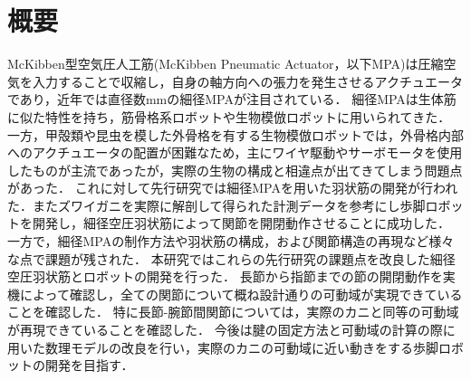 \newpage
\section*{概要}
McKibben型空気圧人工筋(McKibben Pneumatic Actuator，以下MPA)は圧縮空気を入力することで収縮し，自身の軸方向への張力を発生させるアクチュエータであり，近年では直径数mmの細径MPAが注目されている．
細径MPAは生体筋に似た特性を持ち，筋骨格系ロボットや生物模倣ロボットに用いられてきた．
一方，甲殻類や昆虫を模した外骨格を有する生物模倣ロボットでは，外骨格内部へのアクチュエータの配置が困難なため，主にワイヤ駆動やサーボモータを使用したものが主流であったが，実際の生物の構成と相違点が出てきてしまう問題点があった．
これに対して先行研究では細径MPAを用いた羽状筋の開発が行われた．またズワイガニを実際に解剖して得られた計測データを参考にし歩脚ロボットを開発し，細径空圧羽状筋によって関節を開閉動作させることに成功した．
一方で，細径MPAの制作方法や羽状筋の構成，および関節構造の再現など様々な点で課題が残された．
本研究ではこれらの先行研究の課題点を改良した細径空圧羽状筋とロボットの開発を行った．
長節から指節までの節の開閉動作を実機によって確認し，全ての関節について概ね設計通りの可動域が実現できていることを確認した．
特に長節-腕節間関節については，実際のカニと同等の可動域が再現できていることを確認した．
今後は腱の固定方法と可動域の計算の際に用いた数理モデルの改良を行い，実際のカニの可動域に近い動きをする歩脚ロボットの開発を目指す．
